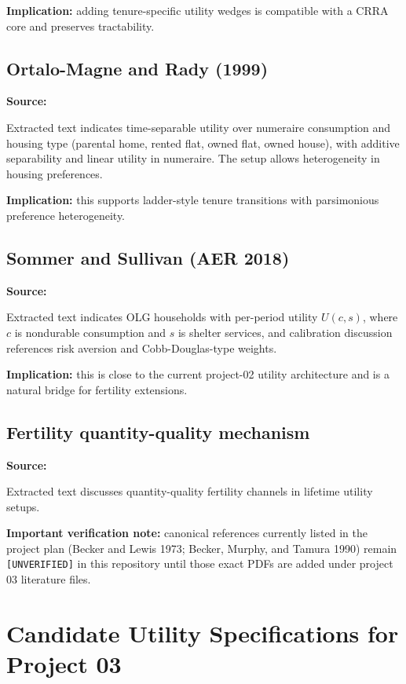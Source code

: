 \documentclass[11pt]{article}
\begin{document}
\textbf{Implication:} adding tenure-specific utility wedges is compatible with a CRRA core and preserves tractability.

\subsection{Ortalo-Magne and Rady (1999)}
\textbf{Source:} 

Extracted text indicates time-separable utility over numeraire consumption and housing type (parental home, rented flat, owned flat, owned house), with additive separability and linear utility in numeraire. The setup allows heterogeneity in housing preferences.

\textbf{Implication:} this supports ladder-style tenure transitions with parsimonious preference heterogeneity.

\subsection{Sommer and Sullivan (AER 2018)}
\textbf{Source:} 

Extracted text indicates OLG households with per-period utility \(U(c,s)\), where \(c\) is nondurable consumption and \(s\) is shelter services, and calibration discussion references risk aversion and Cobb-Douglas-type weights.

\textbf{Implication:} this is close to the current project-02 utility architecture and is a natural bridge for fertility extensions.

\subsection{Fertility quantity-quality mechanism}
\textbf{Source:} 

Extracted text discusses quantity-quality fertility channels in lifetime utility setups.

\textbf{Important verification note:} canonical references currently listed in the project plan (Becker and Lewis 1973; Becker, Murphy, and Tamura 1990) remain \texttt{[UNVERIFIED]} in this repository until those exact PDFs are added under project 03 literature files.

\section{Candidate Utility Specifications for Project 03}
\end{document}
